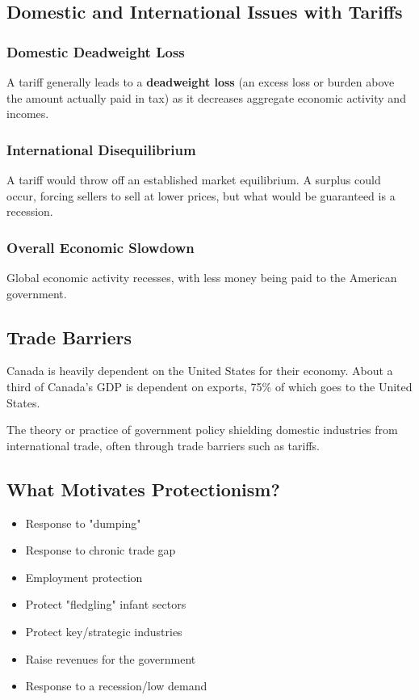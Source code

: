 \subsection{Domestic and International Issues with Tariffs}

\subsubsection{Domestic Deadweight Loss}
A tariff generally leads to a \textbf{deadweight loss} 
(an excess loss or burden above the amount actually 
paid in tax) as it decreases aggregate economic 
activity and incomes.

\subsubsection{International Disequilibrium}
A tariff would throw off an established market equilibrium. 
A surplus could occur, forcing sellers to sell at lower prices, 
but what would be guaranteed is a recession.

\subsubsection{Overall Economic Slowdown}
Global economic activity recesses, with less money being paid to 
the American government.

\subsection{Trade Barriers}
Canada is heavily dependent on the United States for their economy.
About a third of Canada's GDP is dependent on exports, 75\% of which 
goes to the United States.

\begin{definition}[Protectionism]
The theory or practice of government policy shielding domestic 
industries from international trade, often through trade barriers such as tariffs.
\end{definition}

\subsection{What Motivates Protectionism?}
\begin{itemize}
    \item Response to "dumping"
    \item Response to chronic trade gap
    \item Employment protection 
    \item Protect "fledgling" infant sectors
    \item Protect key/strategic industries
    \item Raise revenues for the government
    \item Response to a recession/low demand
\end{itemize}

